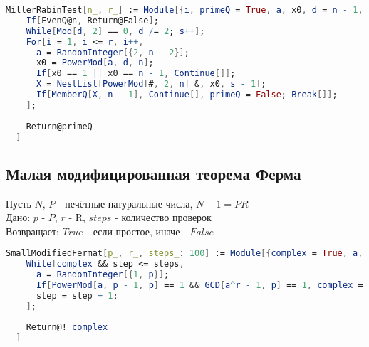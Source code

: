 \begin{lstlisting}[language=Mathematica,caption={
  Улучшенный тест Миллера-Рабина  
}]
  MillerRabinTest[n_, r_] := Module[{i, primeQ = True, a, x0, d = n - 1, s = 0, X},
    If[EvenQ@n, Return@False];
    While[Mod[d, 2] == 0, d /= 2; s++];
    For[i = 1, i <= r, i++,
      a = RandomInteger[{2, n - 2}];
      x0 = PowerMod[a, d, n];
      If[x0 == 1 || x0 == n - 1, Continue[]];
      X = NestList[PowerMod[#, 2, n] &, x0, s - 1];
      If[MemberQ[X, n - 1], Continue[], primeQ = False; Break[]];
    ];
    
    Return@primeQ
  ] 
\end{lstlisting}

\subsection{Малая модифицированная теорема Ферма}

  Пусть {$N$}, {$P$} - нечётные натуральные числа, {$N-1 = PR$} \\
  Дано: {$p$} - {$P$}, {$r$} - R, {$steps$} - количество проверок \\
  Возвращает: {$True$} - если простое, иначе - {$False$}

\begin{lstlisting}[language=Mathematica,caption={
  Малая модифицированная теорема Ферма  
}]
  SmallModifiedFermat[p_, r_, steps_: 100] := Module[{complex = True, a, step = 0},
    While[complex && step <= steps,
      a = RandomInteger[{1, p}];
      If[PowerMod[a, p - 1, p] == 1 && GCD[a^r - 1, p] == 1, complex = False];
      step = step + 1;
    ];
    
    Return@! complex
  ] 
\end{lstlisting}